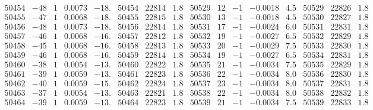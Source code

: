 \documentclass[11pt,reqno,a4letter]{article}
\numberwithin{figure}{section}
\numberwithin{table}{section}
\theoremstyle{plain}
\numberwithin{theorem}{section}
\theoremstyle{definition}
\begin{document}
\begin{table}[ht]
\begin{equation*}
{\begin{array}{ccccc|ccc||ccccc|ccc}
50454 & -48 & 1 & 0.0073 & -18. & 50454 & 22814 & 1.8 & 50529 & 12 & -1 & -0.0018 & 4.5 & 50529 & 22826 & 1.8  \\
50455 & -47 & 1 & 0.0068 & -18. & 50455 & 22815 & 1.8 & 50530 & 13 & -1 & -0.0018 & 4.5 & 50530 & 22827 & 1.8  \\
50456 & -48 & 1 & 0.0073 & -18. & 50456 & 22814 & 1.8 & 50531 & 17 & -1 & -0.0024 & 6.0 & 50531 & 22831 & 1.8  \\
50457 & -46 & 1 & 0.0068 & -16. & 50457 & 22812 & 1.8 & 50532 & 19 & -1 & -0.0027 & 6.5 & 50532 & 22829 & 1.8  \\
50458 & -45 & 1 & 0.0068 & -16. & 50458 & 22813 & 1.8 & 50533 & 20 & -1 & -0.0029 & 7.5 & 50533 & 22830 & 1.8  \\
50459 & -46 & 1 & 0.0068 & -16. & 50459 & 22814 & 1.8 & 50534 & 19 & -1 & -0.0027 & 6.5 & 50534 & 22831 & 1.8  \\
50460 & -38 & 1 & 0.0054 & -13. & 50460 & 22822 & 1.8 & 50535 & 21 & -1 & -0.0034 & 7.5 & 50535 & 22829 & 1.8  \\
50461 & -39 & 1 & 0.0059 & -13. & 50461 & 22823 & 1.8 & 50536 & 22 & -1 & -0.0034 & 8.0 & 50536 & 22830 & 1.8  \\
50462 & -40 & 1 & 0.0059 & -15. & 50462 & 22824 & 1.8 & 50537 & 23 & -1 & -0.0034 & 8.0 & 50537 & 22831 & 1.8  \\
50463 & -37 & 1 & 0.0054 & -13. & 50463 & 22821 & 1.8 & 50538 & 22 & -1 & -0.0034 & 8.0 & 50538 & 22832 & 1.8  \\
50464 & -39 & 1 & 0.0059 & -13. & 50464 & 22823 & 1.8 & 50539 & 21 & -1 & -0.0034 & 7.5 & 50539 & 22833 & 1.8  \\
\end{array} 
}
\end{equation*} 
\clearpage 

\end{table} 

\clearpage 
\end{document}

